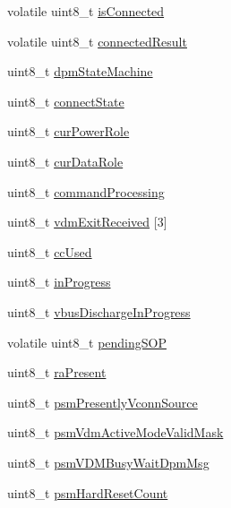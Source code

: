 \begin{DoxyCompactItemize}
\item 
volatile uint8\-\_\-t \hyperlink{struct__pd__instance_aefbe7a5da39f65fa52efdc9cbae4d9cc}{is\-Connected}
\item 
volatile uint8\-\_\-t \hyperlink{struct__pd__instance_aa310a61602eb5d34b4b511ce4ad60f1d}{connected\-Result}
\item 
uint8\-\_\-t \hyperlink{struct__pd__instance_a6e12cc53d94812cf2a28973fae7c6a7e}{dpm\-State\-Machine}
\item 
uint8\-\_\-t \hyperlink{struct__pd__instance_a4f8aff7c9d2b914a5be9f0bd297c197c}{connect\-State}
\item 
uint8\-\_\-t \hyperlink{struct__pd__instance_aea65859fe3a8409ac66aa9f54fb119bf}{cur\-Power\-Role}
\item 
uint8\-\_\-t \hyperlink{struct__pd__instance_a766dd3de4bdd34f1eebcd41d1425327a}{cur\-Data\-Role}
\item 
uint8\-\_\-t \hyperlink{struct__pd__instance_a19172e14529d11e2239205c36accdfba}{command\-Processing}
\item 
uint8\-\_\-t \hyperlink{struct__pd__instance_afcd5caf46554e0640a45ac547d7bacf0}{vdm\-Exit\-Received} \mbox{[}3\mbox{]}
\item 
uint8\-\_\-t \hyperlink{struct__pd__instance_a0087c1b246d026c864194bf77ebcf654}{cc\-Used}
\item 
uint8\-\_\-t \hyperlink{struct__pd__instance_af4167196731cf1a846f23c4d6473181c}{in\-Progress}
\item 
uint8\-\_\-t \hyperlink{struct__pd__instance_a4905e96236b6de63bba2c1d34c5a0a8b}{vbus\-Discharge\-In\-Progress}
\item 
volatile uint8\-\_\-t \hyperlink{struct__pd__instance_a007de2aa1ac9ae814d10d26a949dd61d}{pending\-S\-O\-P}
\item 
uint8\-\_\-t \hyperlink{struct__pd__instance_a5905690cc5a12a0758be0574d4bc262e}{ra\-Present}
\item 
uint8\-\_\-t \hyperlink{struct__pd__instance_a1b1254d08a7d1b7809c37ac0e1253ed5}{psm\-Presently\-Vconn\-Source}
\item 
uint8\-\_\-t \hyperlink{struct__pd__instance_aec0a54cf65dfa1880cb41eccb8caa043}{psm\-Vdm\-Active\-Mode\-Valid\-Mask}
\item 
uint8\-\_\-t \hyperlink{struct__pd__instance_aa73d40dd2f32910810c5b58fd7ada98f}{psm\-V\-D\-M\-Busy\-Wait\-Dpm\-Msg}
\item 
uint8\-\_\-t \hyperlink{struct__pd__instance_adb289c40585aa5170d8208d0202f55e5}{psm\-Hard\-Reset\-Count}
\item 

\end{DoxyCompactItemize}
